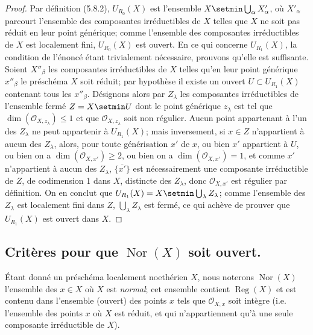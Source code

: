 \begin{proof}
Par définition (5.8.2), $U_{R_0}(X)$ est l'ensemble
$X\setmin\bigcup_\alpha X'_\alpha$, où $X'_\alpha$ parcourt l'ensemble des
composantes irréductibles de $X$ telles que $X$ ne soit pas réduit en leur
point générique; comme l'ensemble des composantes irréductibles de $X$ est
localement fini, $U_{R_0}(X)$ est ouvert. En ce qui concerne $U_{R_1}(X)$,
la condition de l'énoncé étant trivialement nécessaire, prouvons qu'elle est
suffisante. Soient $X''_\beta$ les composantes irréductibles de $X$ telles
qu'en leur point générique $x''_\beta$ le préschéma $X$ soit réduit; par
hypothèse il existe un ouvert $U\subset U_{R_1}(X)$ contenant tous les
$x''_\beta$. Désignons alors par $Z_\lambda$ les composantes irréductibles
de l'ensemble fermé $Z=X\setmin U$ dont le point générique $z_\lambda$ est tel que
$\dim(\mathcal O_{X,z_\lambda})\leq1$ et que
$\mathcal O_{X,z_\lambda}$ soit non régulier. Aucun point appartenant à
l'un des $Z_\lambda$ ne peut appartenir
à $U_{R_1}(X)$; mais inversement, si $x\in Z$ n'appartient à aucun des
$Z_\lambda$, alors, pour toute générisation $x'$ de $x$, ou bien $x'$
appartient à $U$, ou bien on a $\dim(\mathcal O_{X,x'})\geq2$, ou bien on a
$\dim(\mathcal O_{X,x'})=1$, et comme $x'$ n'appartient à aucun des
$Z_\lambda$, $\overline{\{x'\}}$ est nécessairement une composante
irréductible de $Z$, de codimension 1 dans $X$, distincte des $Z_\lambda$,
donc $\mathcal O_{X,x'}$ est régulier par définition. On en conclut que
$U_{R_1}(X)=X\setmin\bigcup_\lambda Z_\lambda$; comme l'ensemble des $Z_\lambda$
est localement fini dans $Z$, $\bigcup_\lambda Z_\lambda$ est fermé, ce qui
achève de prouver que $U_{R_1}(X)$ est ouvert dans $X$.
\end{proof}

\subsection{\texorpdfstring{Critères pour que $\operatorname{Nor}(X)$ soit ouvert.}{Critères pour que Nor(X) soit ouvert}}
\label{IV.2.s6.13-fr}

\begin{env}[6.13.1]
\label{IV.2.s6.13.1-fr}
Étant donné un préschéma localement noethérien $X$, nous noterons
$\operatorname{Nor}(X)$ l'ensemble des $x\in X$ où $X$ est \emph{normal}; cet
ensemble contient $\operatorname{Reg}(X)$ et est contenu dans l'ensemble
(ouvert) des points $x$ tels que $\mathcal O_{X,x}$ soit intègre (i.e.
l'ensemble des points $x$ où $X$ est réduit, et qui n'appartiennent qu'à
une seule composante irréductible de $X$).
\end{env}

